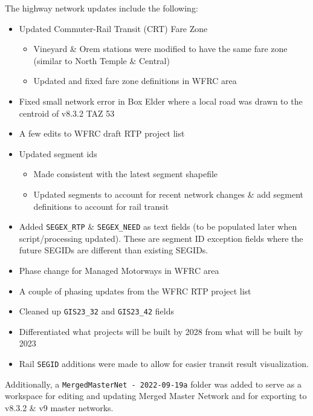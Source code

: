 \documentclass[
  letterpaper,
  DIV=11,
  numbers=noendperiod,
  titlepage=false]{scrreprt}
\providecommand{\tightlist}{%
  \setlength{\itemsep}{0pt}\setlength{\parskip}{0pt}}\usepackage{longtable,booktabs,array}
\begin{document}
The highway network updates include the following:

\begin{itemize}
\tightlist
\item
  Updated Commuter-Rail Transit (CRT) Fare Zone

  \begin{itemize}
  \tightlist
  \item
    Vineyard \& Orem stations were modified to have the same fare zone
    (similar to North Temple \& Central)
  \item
    Updated and fixed fare zone definitions in WFRC area
  \end{itemize}
\item
  Fixed small network error in Box Elder where a local road was drawn to
  the centroid of v8.3.2 TAZ 53
\item
  A few edits to WFRC draft RTP project list
\item
  Updated segment ids

  \begin{itemize}
  \tightlist
  \item
    Made consistent with the latest segment shapefile
  \item
    Updated segments to account for recent network changes \& add
    segment definitions to account for rail transit
  \end{itemize}
\item
  Added \texttt{SEGEX\_RTP} \& \texttt{SEGEX\_NEED} as text fields (to
  be populated later when script/processing updated). These are segment
  ID exception fields where the future SEGIDs are different than
  existing SEGIDs.
\item
  Phase change for Managed Motorways in WFRC area
\item
  A couple of phasing updates from the WFRC RTP project list
\item
  Cleaned up \texttt{GIS23\_32} and \texttt{GIS23\_42} fields
\item
  Differentiated what projects will be built by 2028 from what will be
  built by 2023
\item
  Rail \texttt{SEGID} additions were made to allow for easier transit
  result visualization.
\end{itemize}

Additionally, a \texttt{MergedMasterNet\ -\ 2022-09-19a} folder was
added to serve as a workspace for editing and updating Merged Master
Network and for exporting to v8.3.2 \& v9 master networks.
\end{document}
